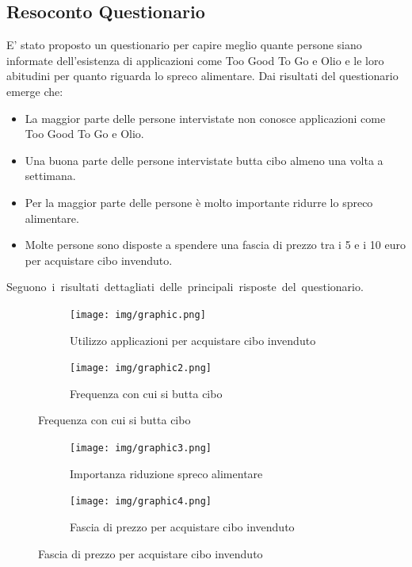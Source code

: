 \documentclass{article}
\begin{document}
\subsection{Resoconto Questionario}
E' stato proposto un questionario per capire meglio quante persone siano informate dell'esistenza di applicazioni come Too Good To Go e Olio e le loro abitudini per quanto riguarda lo spreco alimentare.
\newline
Dai risultati del questionario emerge che:
\begin{itemize}
    \item La maggior parte delle persone intervistate non conosce applicazioni come Too Good To Go e Olio.
    \item Una buona parte delle persone intervistate butta cibo almeno una volta a settimana.
    \item Per la maggior parte delle persone è molto importante ridurre lo spreco alimentare.
    \item Molte persone sono disposte a spendere una fascia di prezzo tra i 5 e i 10 euro per acquistare cibo invenduto.
\end{itemize}
\newpage
\hbox{Seguono i risultati dettagliati delle principali risposte del questionario.}

\begin{figure}[H]
    \centering
    \begin{subfigure}{0.40\textwidth}
        \centering
        \texttt{[image: img/graphic.png]}
        \caption{Utilizzo applicazioni per acquistare cibo invenduto}
    \end{subfigure}
    \hfill
    \begin{subfigure}{0.40\textwidth}
        \centering
        \texttt{[image: img/graphic2.png]}
        \caption{Frequenza con cui si butta cibo}
    \end{subfigure}
\end{figure}

\begin{figure}[H]
    \centering
    \begin{subfigure}{0.40\textwidth}
        \centering
        \texttt{[image: img/graphic3.png]}
        \caption{Importanza riduzione spreco alimentare}
    \end{subfigure}
    \hfill
    \begin{subfigure}{0.40\textwidth}
        \centering
        \texttt{[image: img/graphic4.png]}
        \caption{Fascia di prezzo per acquistare cibo invenduto}
    \end{subfigure}
\end{figure}
\end{document}
